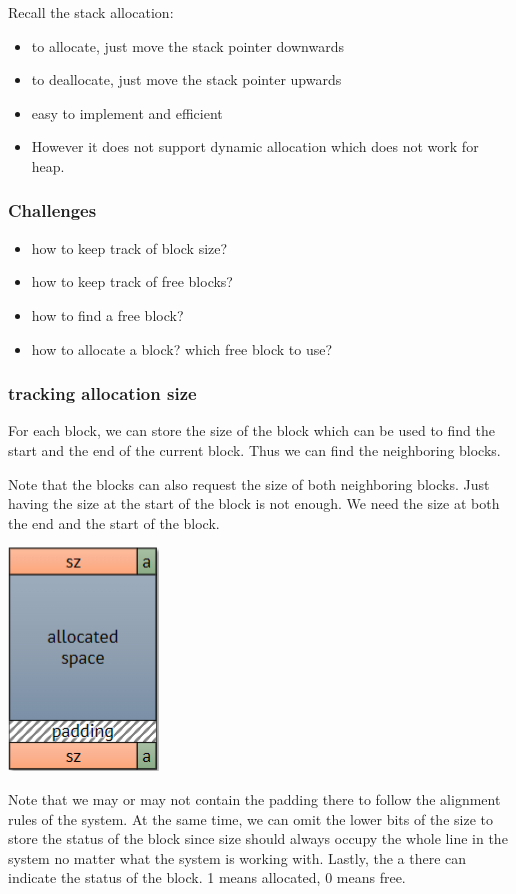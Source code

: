 \documentclass[letterpaper,12pt]{article}
\begin{document}
Recall the stack allocation:\begin{itemize}
    \item to allocate, just move the stack pointer downwards
    \item to deallocate, just move the stack pointer upwards
    \item easy to implement and efficient
    \item However it does not support dynamic allocation which does not work for heap.
\end{itemize}
\subsubsection{Challenges}
\begin{itemize}
    \item how to keep track of block size?
    \item how to keep track of free blocks?
    \item how to find a free block?
    \item how to allocate a block? which free block to use?
\end{itemize}
\subsubsection{tracking allocation size}
For each block, we can store the size of the block which can be used to find
the start and the end of the current block. Thus we can find the neighboring
blocks.

Note that the blocks can also request the size of both neighboring blocks. Just
having the size at the start of the block is not enough. We need the size at
both the end and the start of the block.

\includegraphics*{./Images/Memory track size.png}

Note that we may or may not contain the padding there to follow the alignment
rules of the system. At the same time, we can omit the lower bits of the size
to store the status of the block since size should always occupy the whole line
in the system no matter what the system is working with. Lastly, the a there
can indicate the status of the block. 1 means allocated, 0 means free.
\end{document}
